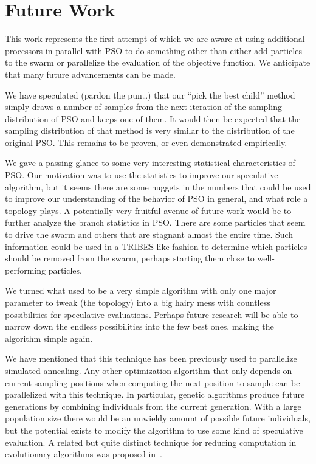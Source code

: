 \documentclass[journal,letterpaper]{IEEEtran}
\begin{document}
\section{Future Work}
\label{sec:future}

This work represents the first attempt of which we are aware at using
additional processors in parallel with PSO to do something other than either
add particles to the swarm or parallelize the evaluation of the objective
function.  We anticipate that many future advancements can be made.

We have speculated (pardon the pun\dots) that our ``pick the best child''
method simply draws a number of samples from the next iteration of the sampling
distribution of PSO and keeps one of them.  It would then be expected that the
sampling distribution of that method is very similar to the distribution of the
original PSO.  This remains to be proven, or even demonstrated empirically.

We gave a passing glance to some very interesting statistical characteristics
of PSO.  Our motivation was to use the statistics to improve our speculative
algorithm, but it seems there are some nuggets in the numbers that could be
used to improve our understanding of the behavior of PSO in general, and what
role a topology plays.  A potentially very fruitful avenue of future work would
be to further analyze the branch statistics in PSO.  There are some particles
that seem to drive the swarm and others that are stagnant almost the entire
time.  Such information could be used in a TRIBES-like fashion to determine
which particles should be removed from the swarm, perhaps starting them close
to well-performing particles.

We turned what used to be a very simple algorithm with only one major parameter
to tweak (the topology) into a big hairy mess with countless possibilities for
speculative evaluations.  Perhaps future research will be able to narrow down
the endless possibilities into the few best ones, making the algorithm simple
again.

We have mentioned that this technique has been previously used to parallelize
simulated annealing.  Any other optimization algorithm that only depends on 
current sampling positions when computing the next position to sample can be
parallelized with this technique.  In particular, genetic algorithms produce
future generations by combining individuals from the current generation.  With
a large population size there would be an unwieldy amount of possible future
individuals, but the potential exists to modify the algorithm to use some kind
of speculative evaluation.  A related but quite distinct technique for reducing
computation in evolutionary algorithms was proposed in~\cite{poli-ai06}.
\end{document}
